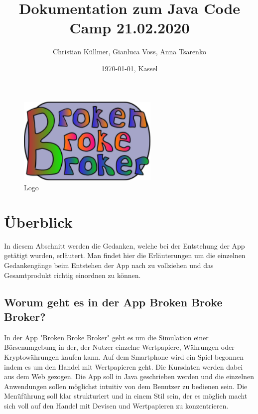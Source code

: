 \documentclass[10pt]{scrartcl}
\begin{document}
\title{Dokumentation zum Java Code Camp 21.02.2020}

\author{Christian Küllmer, Gianluca Voss, Anna Tsarenko}
\date{\today{}, Kassel}
\maketitle
\begin{figure}[H]
	\centering
	\includegraphics[width=0.6\textwidth]{Bilder/Titelblatt/big_logo.png}
	\caption{Logo}
\end{figure}
\newpage
\renewcommand{\contentsname}{Inhaltsverzeichnis}
\tableofcontents
\newpage

\section{Überblick}

In diesem Abschnitt werden die Gedanken, welche bei der Entstehung der App getätigt wurden, erläutert. Man findet hier die Erläuterungen um die einzelnen Gedankengänge beim Entstehen der App nach zu vollziehen und das Gesamtprodukt richtig einordnen zu können.

\subsection{Worum geht es in der App Broken Broke Broker?}
In der App "Broken Broke Broker" geht es um die Simulation einer Börsenumgebung in der, der Nutzer einzelne Wertpapiere, Währungen oder Kryptowährungen kaufen kann. Auf dem Smartphone wird ein Spiel begonnen indem es um den Handel mit Wertpapieren geht. Die Kursdaten werden dabei aus dem Web gezogen. Die App soll in Java geschrieben werden und die einzelnen Anwendungen sollen möglichst intuitiv von dem Benutzer zu bedienen sein. Die Menüführung soll klar strukturiert und in einem Stil sein, der es möglich macht sich voll auf den Handel mit Devisen und Wertpapieren zu konzentrieren.
\end{document}
